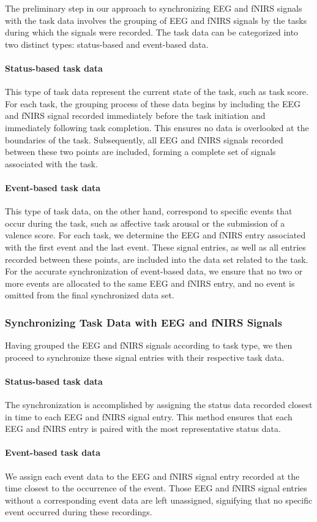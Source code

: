 The preliminary step in our approach to synchronizing EEG and fNIRS signals with the task data involves the grouping of EEG and fNIRS signals by the tasks during which the signals were recorded. The task data can be categorized into two distinct types: status-based and event-based data.

\paragraph{Status-based task data} This type of task data represent the current state of the task, such as task score. For each task, the grouping process of these data begins by including the EEG and fNIRS signal recorded immediately before the task initiation and immediately following task completion. This ensures no data is overlooked at the boundaries of the task. Subsequently, all EEG and fNIRS signals recorded between these two points are included, forming a complete set of signals associated with the task.

\paragraph{Event-based task data} This type of task data, on the other hand, correspond to specific events that occur during the task, such as affective task arousal or the submission of a valence score. For each task, we determine the EEG and fNIRS entry associated with the first event and the last event. These signal entries, as well as all entries recorded between these points, are included into the data set related to the task. For the accurate synchronization of event-based data, we ensure that no two or more events are allocated to the same EEG and fNIRS entry, and no event is omitted from the final synchronized data set.

\subsubsection{Synchronizing Task Data with EEG and fNIRS Signals}

Having grouped the EEG and fNIRS signals according to task type, we then proceed to synchronize these signal entries with their respective task data.

\paragraph{Status-based task data} The synchronization is accomplished by assigning the status data recorded closest in time to each EEG and fNIRS signal entry. This method ensures that each EEG and fNIRS entry is paired with the most representative status data.

\paragraph{Event-based task data} We assign each event data to the EEG and fNIRS signal entry recorded at the time closest to the occurrence of the event. Those EEG and fNIRS signal entries without a corresponding event data are left unassigned, signifying that no specific event occurred during these recordings.
